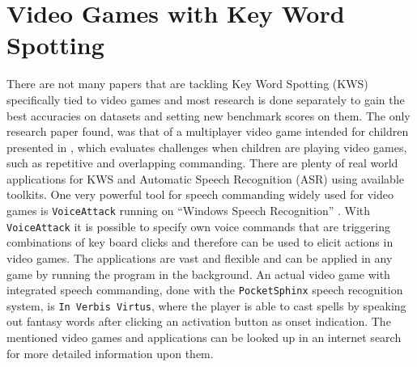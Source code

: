 
\section{Video Games with Key Word Spotting}\label{sec:prev_kws_games}
\thesisStateReady
There are not many papers that are tackling Key Word Spotting (KWS) specifically tied to video games and most research is done separately to gain the best accuracies on datasets and setting new benchmark scores on them.
The only research paper found, was that of a multiplayer video game intended for children presented in \cite{Harshavardhan2015}, which evaluates challenges when children are playing video games, such as repetitive and overlapping commanding.
There are plenty of real world applications for KWS and Automatic Speech Recognition (ASR) using available toolkits.
One very powerful tool for speech commanding widely used for video games is \texttt{VoiceAttack} running on \enquote{Windows Speech Recognition} \cite{Xiong2017}.
With \texttt{VoiceAttack} it is possible to specify own voice commands that are triggering combinations of key board clicks and therefore can be used to elicit actions in video games.
The applications are vast and flexible and can be applied in any game by running the program in the background.
An actual video game with integrated speech commanding, done with the \texttt{PocketSphinx} \cite{Huggins2006} speech recognition system, is \texttt{In Verbis Virtus}, where the player is able to cast spells by speaking out fantasy words after clicking an activation button as onset indication.
The mentioned video games and applications can be looked up in an internet search for more detailed information upon them.